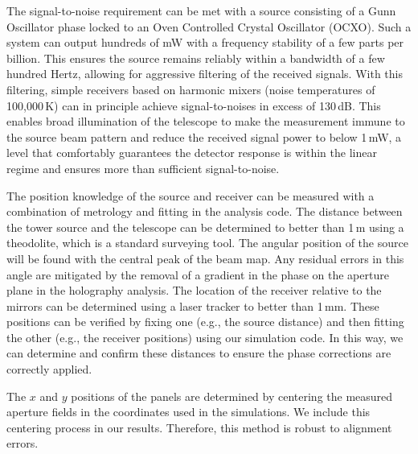 The signal-to-noise requirement can be met with a source consisting of a Gunn Oscillator phase locked to an Oven Controlled Crystal Oscillator (OCXO).  Such a system can output hundreds of mW with a frequency stability of a few parts per billion.  This ensures the source remains reliably within a bandwidth of a few hundred Hertz, allowing for aggressive filtering of the received signals.  With this filtering, simple receivers based on harmonic mixers (noise temperatures of 100,000\,K) can in principle achieve signal-to-noises in excess of 130\,dB.  This enables broad illumination of the telescope to make the measurement immune to the source beam pattern and reduce the received signal power to below 1\,mW, a level that comfortably guarantees the detector response is within the linear regime and ensures more than sufficient signal-to-noise.

The position knowledge of the source and receiver can be measured with a combination of metrology and fitting in the analysis code.  The distance between the tower source and the telescope can be determined to better than 1\,m using a theodolite, which is a standard surveying tool.  The angular position of the source will be found with the central peak of the beam map.  Any residual errors in this angle are mitigated by the removal of a gradient in the phase on the aperture plane in the holography analysis.  The location of the receiver relative to the mirrors can be determined using a laser tracker to better than 1\,mm.  These positions can be verified by fixing one (e.g., the source distance) and then fitting the other (e.g., the receiver positions) using our simulation code.  In this way, we can determine and confirm these distances to ensure the phase corrections are correctly applied.  

The $x$ and $y$ positions of the panels are determined by centering the measured aperture fields in the coordinates used in the simulations.  We include this centering process in our results.  Therefore, this method is robust to alignment errors.

